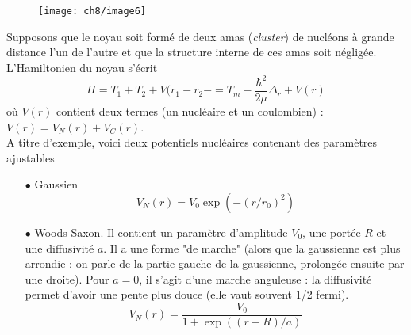 	\begin{wrapfigure}[5]{l}{4.8cm}
	\vspace{-5mm}
	\texttt{[image: ch8/image6]}
	\end{wrapfigure}
Supposons que le noyau soit formé de deux amas (\textit{cluster}) de nucléons à grande distance l'un de l'autre 
et que la structure interne de ces amas soit négligée.  L'Hamiltonien du noyau s'écrit
\begin{equation}
H=T_1+T_2 +V(r_1-r_2- = T_m-\frac{\hbar^2}{2\mu}\Delta_r+V(r)
\end{equation}
où $V(r)$ contient deux termes (un nucléaire et un coulombien) : $V(r)=V_N(r)+V_C(r)$.\\

A titre d'exemple, voici deux potentiels nucléaires contenant des paramètres ajustables
\begin{itemize}
\item[$\bullet$] Gaussien
\begin{equation}
V_N(r) = V_0\exp(-(r/r_0)^2)
\end{equation}
\item[$\bullet$] Woods-Saxon. Il contient un paramètre d'amplitude $V_0$, une portée $R$ et une diffusivité $a$. Il
a une forme "de marche" (alors que la gaussienne est plus arrondie : on parle de la partie gauche de la
gaussienne, prolongée ensuite par une droite). Pour $a=0$, il s'agit d'une marche anguleuse : la diffusivité
permet d'avoir une pente plus douce (elle vaut souvent 1/2 fermi).
\begin{equation}
V_N(r) = \frac{V_0}{1+\exp((r-R)/a)}
\end{equation}
\end{itemize}

